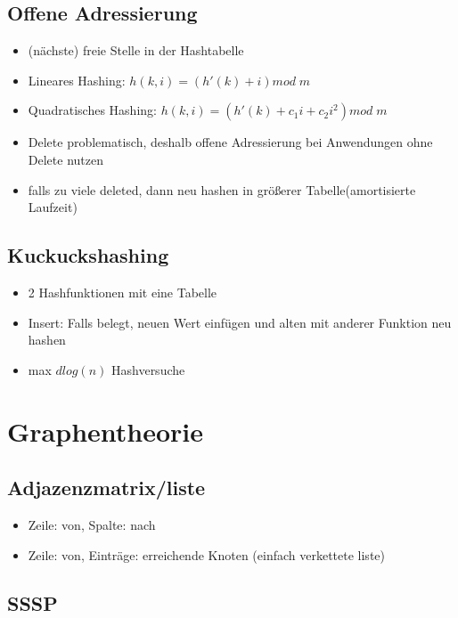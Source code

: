 \documentclass{article}
\begin{document}
\subsection{Offene Adressierung}
\begin{itemize}
\item (n{\"a}chste) freie Stelle in der Hashtabelle
\item Lineares Hashing: $h(k,i) = (h'(k) +i) mod \; m$
\item Quadratisches Hashing: $h(k,i) = (h'(k) +c_1i+ c_2 i^2) mod \; m$
\item Delete problematisch, deshalb offene Adressierung bei Anwendungen ohne Delete nutzen
\item falls zu viele deleted, dann neu hashen in gr{\"o}\ss erer Tabelle(amortisierte Laufzeit)
\end{itemize}

\subsection{Kuckuckshashing}
\begin{itemize}
\item 2 Hashfunktionen mit eine Tabelle
\item Insert: Falls belegt, neuen Wert einf{\"u}gen und alten mit anderer Funktion neu hashen
\item max $d log(n)$ Hashversuche
\end{itemize}


\section{Graphentheorie}
\subsection{Adjazenzmatrix/liste}
\begin{itemize}
\item Zeile: von, Spalte: nach
\item Zeile: von, Eintr{\"a}ge: erreichende Knoten (einfach verkettete liste)
\end{itemize}

\subsection{SSSP}
\end{document}
